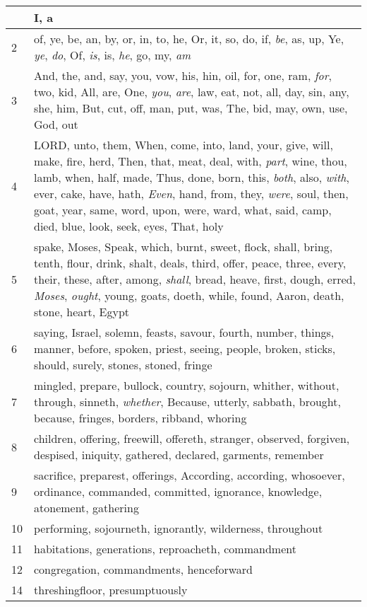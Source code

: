 \begin{longtable}{l|p{3.75in}}
\hline \hline
\endlastfoot
1 & I, a \\ \hline
2 & of, ye, be, an, by, or, in, to, he, Or, it, so, do, if, \emph{be}, as, up, Ye, \emph{ye}, \emph{do}, Of, \emph{is}, is, \emph{he}, go, my, \emph{am} \\ \hline
3 & And, the, and, say, you, vow, his, hin, oil, for, one, ram, \emph{for}, two, kid, All, are, One, \emph{you}, \emph{are}, law, eat, not, all, day, sin, any, she, him, But, cut, off, man, put, was, The, bid, may, own, use, God, out \\ \hline
4 & LORD, unto, them, When, come, into, land, your, give, will, make, fire, herd, Then, that, meat, deal, with, \emph{part}, wine, thou, lamb, when, half, made, Thus, done, born, this, \emph{both}, also, \emph{with}, ever, cake, have, hath, \emph{Even}, hand, from, they, \emph{were}, soul, then, goat, year, same, word, upon, were, ward, what, said, camp, died, blue, look, seek, eyes, That, holy \\ \hline
5 & spake, Moses, Speak, which, burnt, sweet, flock, shall, bring, tenth, flour, drink, shalt, deals, third, offer, peace, three, every, their, these, after, among, \emph{shall}, bread, heave, first, dough, erred, \emph{Moses}, \emph{ought}, young, goats, doeth, while, found, Aaron, death, stone, heart, Egypt \\ \hline
6 & saying, Israel, solemn, feasts, savour, fourth, number, things, manner, before, spoken, priest, seeing, people, broken, sticks, should, surely, stones, stoned, fringe \\ \hline
7 & mingled, prepare, bullock, country, sojourn, whither, without, through, sinneth, \emph{whether}, Because, utterly, sabbath, brought, because, fringes, borders, ribband, whoring \\ \hline
8 & children, offering, freewill, offereth, stranger, observed, forgiven, despised, iniquity, gathered, declared, garments, remember \\ \hline
9 & sacrifice, preparest, offerings, According, according, whosoever, ordinance, commanded, committed, ignorance, knowledge, atonement, gathering \\ \hline
10 & performing, sojourneth, ignorantly, wilderness, throughout \\ \hline
11 & habitations, generations, reproacheth, commandment \\ \hline
12 & congregation, commandments, henceforward \\ \hline
14 & threshingfloor, presumptuously \\ \hline
\end{longtable}






